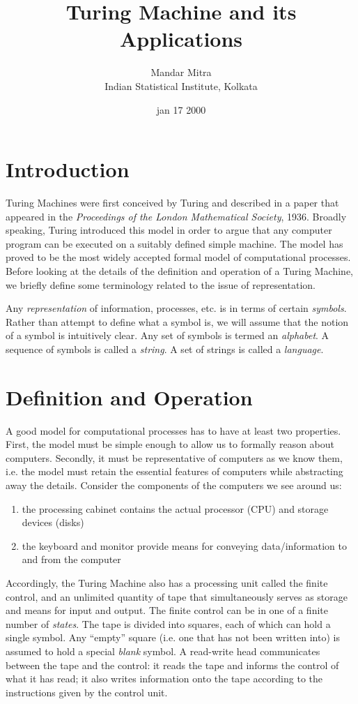 \documentclass[12pt]{article}
\title{\textbf{Turing Machine and its Applications}}
\author{Mandar Mitra \\ Indian Statistical Institute, Kolkata}
\date{jan 17 2000}
\begin{document}
\section{Introduction}
Turing Machines  were first  conceived by Turing  and described in  a paper
that appeared in the \emph{Proceedings of the London Mathematical Society},
1936. Broadly speaking, Turing introduced this model in order to argue that
any  computer  program  can  be  executed  on  a  suitably  defined  simple
machine. The model  has proved to be the most  widely accepted formal model
of computational processes. Before looking at the details of the definition
and  operation of  a Turing  Machine,  we briefly  define some  terminology
related to the issue of representation.

    Any   \emph{representation}    of   information,
processes, etc. is in terms  of certain \emph{symbols}. Rather than attempt
to define what a  symbol is, we will assume that the  notion of a symbol is
intuitively  clear.  Any  set of  symbols is  termed an  \emph{alphabet}. A
sequence of symbols is called a \emph{string}. A set of strings is called a
\emph{language}.


\section{Definition and Operation}
A  good  model  for  computational  processes  has to  have  at  least  two
properties. First, the model must be  simple enough to allow us to formally
reason about  computers.  Secondly, it must be  representative of computers
as  we know  them, i.e.  the model  must retain  the essential  features of
computers while  abstracting away the  details. Consider the  components of
the computers we see around us:
\begin{enumerate}
\item  the  processing cabinet  contains  the  actual  processor (CPU)  and
  storage devices (disks)
\item the keyboard and monitor provide means for conveying data/information
  to and from the computer
\end{enumerate}
Accordingly,  the Turing  Machine also  has  a processing  unit called  the
finite  control, and  an  unlimited quantity  of  tape that  simultaneously
serves as storage and means for input and output. The finite control can be
in  one of  a finite  number of  \emph{states}.  The  tape is  divided into
squares,  each of  which can  hold a  single symbol.  Any  ``empty'' square
(i.e. one  that has  not been written  into) is  assumed to hold  a special
\emph{blank} symbol.  A read-write head  communicates between the  tape and
the control: it reads the tape and informs the control of what it has read;
it  also writes  information onto  the tape  according to  the instructions
given by the control unit. 
\end{document}
